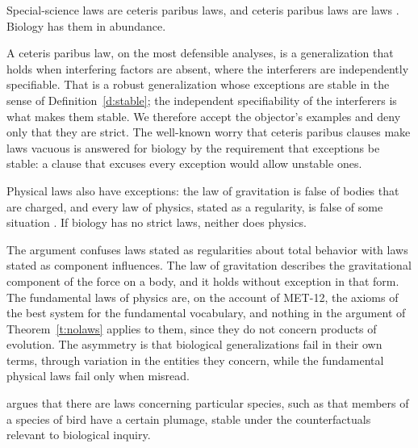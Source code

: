 \documentclass{situationist-preprint}
\begin{document}
\begin{objection}
Special-science laws are ceteris paribus laws, and ceteris paribus laws are laws \citep{Fodor1974}. Biology has them in abundance.
\end{objection}

\begin{reply}
A ceteris paribus law, on the most defensible analyses, is a generalization that holds when interfering factors are absent, where the interferers are independently specifiable. That is a robust generalization whose exceptions are stable in the sense of Definition~\ref{d:stable}; the independent specifiability of the interferers is what makes them stable. We therefore accept the objector's examples and deny only that they are strict. The well-known worry that ceteris paribus clauses make laws vacuous \citep{EarmanRoberts1999} is answered for biology by the requirement that exceptions be stable: a clause that excuses every exception would allow unstable ones.
\end{reply}

\begin{objection}
Physical laws also have exceptions: the law of gravitation is false of bodies that are charged, and every law of physics, stated as a regularity, is false of some situation \citep{Cartwright1983}. If biology has no strict laws, neither does physics.
\end{objection}

\begin{reply}
The argument confuses laws stated as regularities about total behavior with laws stated as component influences. The law of gravitation describes the gravitational component of the force on a body, and it holds without exception in that form. The fundamental laws of physics are, on the account of MET-12, the axioms of the best system for the fundamental vocabulary, and nothing in the argument of Theorem~\ref{t:nolaws} applies to them, since they do not concern products of evolution. The asymmetry is that biological generalizations fail in their own terms, through variation in the entities they concern, while the fundamental physical laws fail only when misread.
\end{reply}

\begin{objection}
\citet{Lange1995} argues that there are laws concerning particular species, such as that members of a species of bird have a certain plumage, stable under the counterfactuals relevant to biological inquiry.
\end{objection}
\end{document}

